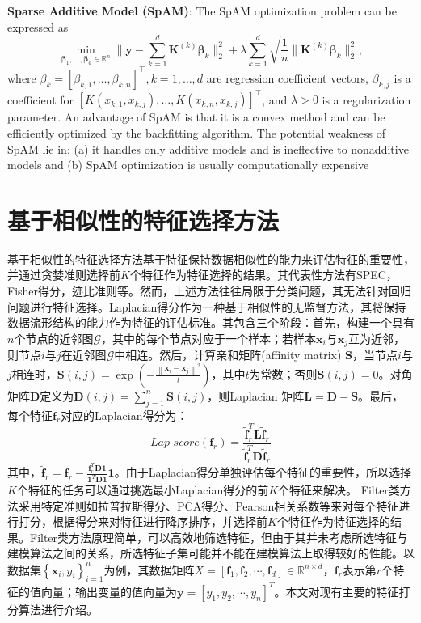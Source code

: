\documentclass[lang=cn,10pt]{gorgeousnbook}
\numberwithin{equation}{section}%
\numberwithin{figure}{section}%
\begin{document}
\textbf{ Sparse Additive Model (SpAM)}: The SpAM optimization problem can be expressed as
\begin{equation}
\min\limits_{\boldsymbol{\beta}_1,\dots,\boldsymbol{\beta}_d\in\mathbb{R}^n}\|\boldsymbol{y}-\sum\limits_{k=1}^d\boldsymbol{K}^{(k)}\boldsymbol{\beta}_k\|_2^2+\lambda\sum\limits_{k=1}^d\sqrt{\frac{1}{n}\|\boldsymbol{K}^{(k)}\boldsymbol{\beta}_k\|_2^2},
\end{equation}
where $\beta_k = [\beta_{k,1},\ldots,\beta_{k,n}]^\top,k = 1,\ldots,d$ are regression coefficient vectors, $\beta_{k,j}$ is a coefficient for $[K(x_{k,1},x_{k,j}),\ldots,K(x_{k,n},x_{k,j})]^{\top}$, and $\lambda>0 $ is a regularization parameter. An advantage of SpAM is that it is a convex method and can be efficiently optimized by the backfitting algorithm. The potential weakness of SpAM lie in: (a)
it handles only additive models and is ineffective to nonadditive models and (b) SpAM optimization is usually
computationally expensive
\section{基于相似性的特征选择方法}
基于相似性的特征选择方法基于特征保持数据相似性的能力来评估特征的重要性，并通过贪婪准则选择前$K$个特征作为特征选择的结果。其代表性方法有SPEC，Fisher得分，迹比准则等。然而，上述方法往往局限于分类问题，其无法针对回归问题进行特征选择。Laplacian得分作为一种基于相似性的无监督方法，其将保持数据流形结构的能力作为特征的评估标准。其包含三个阶段：首先，构建一个具有$n$个节点的近邻图$\mathcal{G}$，其中的每个节点对应于一个样本；若样本$\bm{x}_i$与$\bm{x}_j$互为近邻，则节点$i$与$j$在近邻图$\mathcal{G}$中相连。然后，计算亲和矩阵(affinity matrix) $\bm{S}$，当节点$i$与$j$相连时，$\bm{S}\left( i,j \right) =\exp \left( -\frac{\left\| \boldsymbol{x}_i-\boldsymbol{x}_j \right\| ^2}{t} \right) $，其中$t$为常数；否则$\bm{S}\left( i,j \right)  = 0$。对角矩阵$\bm{D}$定义为$\bm{D}\left( i,j \right) =\sum\nolimits_{j=1}^n{\bm{S}\left( i,j \right)}$，则Laplacian 矩阵$\bm{L} = \bm{D}-\bm{S}$。最后，每个特征$\bm{f}_r$对应的Laplacian得分为：
\begin{equation}
Lap\_score(\bm{f}_r)=\frac{\tilde{\bm{f}}_{r}^{T}\bm{L}\tilde{\bm{f}}_r}{\tilde{\bm{f}}_{r}^{T}\bm{D}\tilde{\bm{f}}_r}
\end{equation}
其中，$\tilde{\bm{f}}_r=\bm{f}_r-\frac{\bm{f}_{r}^{T}\bm{D}\bm{1}}{\bm{1}^T\bm{D}\bm{1}}\bm{1}$。由于Laplacian得分单独评估每个特征的重要性，所以选择$K$个特征的任务可以通过挑选最小Laplacian得分的前$K$个特征来解决。
Filter类方法采用特定准则如拉普拉斯得分、PCA得分、Pearson相关系数等来对每个特征进行打分，根据得分来对特征进行降序排序，并选择前$K$个特征作为特征选择的结果。Filter类方法原理简单，可以高效地筛选特征，但由于其并未考虑所选特征与建模算法之间的关系，所选特征子集可能并不能在建模算法上取得较好的性能。以数据集$\left\{ \boldsymbol{x}_i,y_i \right\} _{i=1}^{n}$为例，其数据矩阵$X=\left[ \bm{f}_1,\bm{f}_2,\cdots ,\bm{f}_d \right] \in \mathbb{R} ^{n\times d}$，$\bm{f}_r$表示第$r$个特征的值向量；输出变量的值向量为$\bm{y}=\left[ y_1,y_2,\cdots ,y_n \right]^T $。本文对现有主要的特征打分算法进行介绍。
\end{document}

